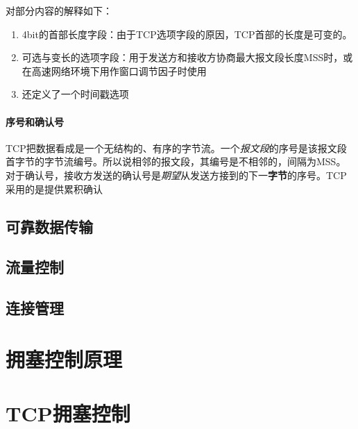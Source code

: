 \documentclass[]{report}
\begin{document}
\begin{figure}[h!]
\begin{minipage}{20em}
				\end{minipage}
			\end{figure}
			对部分内容的解释如下：
			\begin{enumerate}
				\item 4bit的首部长度字段：由于TCP选项字段的原因，TCP首部的长度是可变的。
				\item 可选与变长的选项字段：用于发送方和接收方协商最大报文段长度MSS时，或在高速网络环境下用作窗口调节因子时使用
				\item 还定义了一个时间戳选项
			\end{enumerate}
			\paragraph{序号和确认号}
			TCP把数据看成是一个无结构的、有序的字节流。一个\textit{报文段}的序号是该报文段首字节的字节流编号。所以说相邻的报文段，其编号是不相邻的，间隔为MSS。对于确认号，接收方发送的确认号是\textit{期望}从发送方接到的下一\textbf{字节}的序号。TCP采用的是提供累积确认
		\subsection{可靠数据传输}
		\subsection{流量控制}
		\subsection{连接管理}
	\section{拥塞控制原理}
	\section{TCP拥塞控制}
\end{document}
